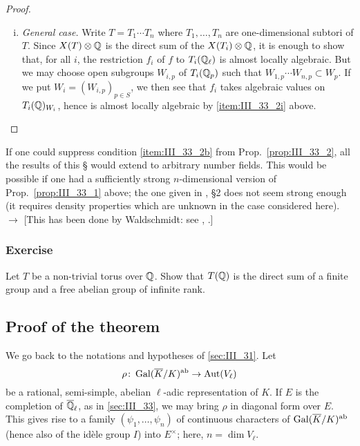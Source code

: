 \begin{proof}
\begin{enumerate}[i)]
\item \emph{General case.} Write $T = T_1 \cdots T_n$ where $T_1, \dots, T_n$
	are one-dimensional subtori of $T$. Since $X(T) \otimes \mathbb{Q}$ is the
	direct sum of the $X(T_i) \otimes \mathbb{Q}$, it is enough to show that, for
	all $i$, the restriction $f_i$ of $f$ to $T_i(\mathbb{Q}_\ell)$ is almost
	locally algebraic. But we may choose open subgroups $W_{i, p}$ of
	$T_i(\mathbb{Q}_p)$ such that $W_{1,p} \cdots W_{n,p} \subset W_p$. If we put
	$W_i = (W_{i,p})_{p\in S}$, we then see that $f_i$ takes algebraic
	values on $T_i(\mathbb{Q})_{W_i}$, hence is almost locally algebraic by
	\ref{item:III_33_2i} above. \qedhere
\end{enumerate}
\end{proof}

\begin{obs}
	If one could suppress condition \ref{item:III_33_2b} from
	Prop.~\ref{prop:III_33_2}, all the results of this \S{} would extend to
	arbitrary number fields. This would be possible if one had a
	sufficiently strong $n$-dimensional version of
	Prop.~\ref{prop:III_33_1} above; the one given in \cite{30}, \S 2 does
	not seem strong enough (it requires density properties which are
	unknown in the case considered here). $\to$ [This has been done by
	Waldschmidt: see \cite{63}, \cite{83}.]
\end{obs}

\subsubsection*{Exercise}
Let $T$ be a non-trivial torus over $\mathbb{Q}$. Show that $T(\mathbb{Q})$ is the direct sum
of a finite group and a free abelian group of infinite rank.

\dpage 

\subsection{Proof of the theorem}
\label{sec:III_34}

We go back to the notations and hypotheses of \ref{sec:III_31}. Let
\[
	\rho \colon \operatorname{Gal}(\overline{K}/K)^{\mathrm{ab}} \rightarrow \operatorname{Aut}(V_\ell)
\]
be a rational, semi-simple, abelian $\ell$-adic representation of $K$. If $E$ is
the completion of $\overline{\mathbb{Q}}_\ell$, as in \ref{sec:III_33}, we may bring 
$\rho$ in diagonal form over $E$. This gives rise to a family $(\psi_1,
\hdots,\psi_n)$ of continuous characters of $\operatorname{Gal}(\overline{K}/K)^{\mathrm{ab}}$ (hence
also of the idèle group $I$) into $E^\times$; here, $n = \dim V_\ell$.

